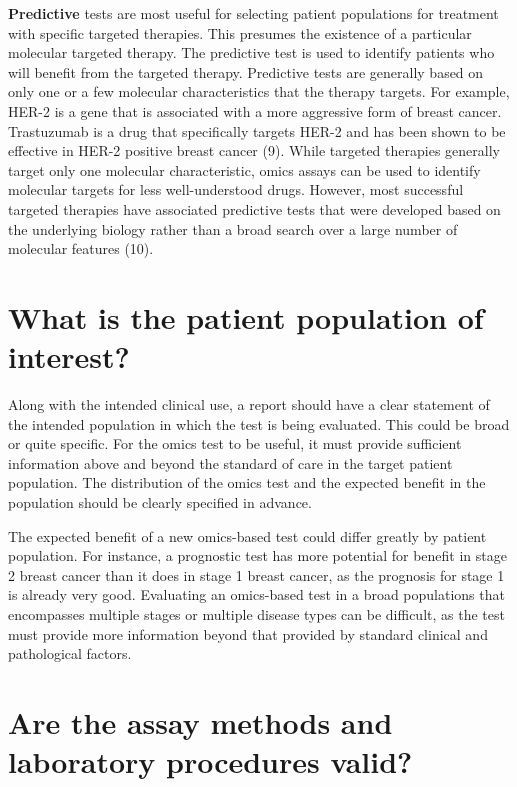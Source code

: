 \documentclass[11pt]{article}
\begin{document}
\textbf{Predictive} tests are most useful for selecting patient
populations for treatment with specific targeted therapies. This
presumes the existence of a particular molecular targeted therapy. The
predictive test is used to identify patients who will benefit from the
targeted therapy. Predictive tests are generally based on only one or a
few molecular characteristics that the therapy targets. For example,
HER-2 is a gene that is associated with a more aggressive form of breast
cancer. Trastuzumab is a drug that specifically targets HER-2 and has
been shown to be effective in HER-2 positive breast cancer (9). While
targeted therapies generally target only one molecular characteristic,
omics assays can be used to identify molecular targets for less
well-understood drugs. However, most successful targeted therapies have
associated predictive tests that were developed based on the underlying
biology rather than a broad search over a large number of molecular
features (10).

\section{What is the patient population of
interest?}\label{what-is-the-patient-population-of-interest}

Along with the intended clinical use, a report should have a clear
statement of the intended population in which the test is being
evaluated. This could be broad or quite specific. For the omics test to
be useful, it must provide sufficient information above and beyond the
standard of care in the target patient population. The distribution of
the omics test and the expected benefit in the population should be
clearly specified in advance.

The expected benefit of a new omics-based test could differ greatly by
patient population. For instance, a prognostic test has more potential
for benefit in stage 2 breast cancer than it does in stage 1 breast
cancer, as the prognosis for stage 1 is already very good. Evaluating an
omics-based test in a broad populations that encompasses multiple stages
or multiple disease types can be difficult, as the test must provide
more information beyond that provided by standard clinical and
pathological factors.

\section{Are the assay methods and laboratory procedures
valid?}\label{are-the-assay-methods-and-laboratory-procedures-valid}
\end{document}
